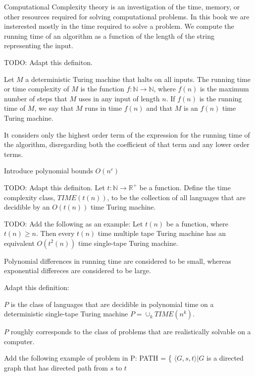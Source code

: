 {\color{red} Computational Complexity theory is an investigation of the time, memory, or other resources required for solving computational problems.} In this book we are insterested mostly in the time required to solve a problem. {\color{red} We compute the running time of an algorithm as a function of the length of the string representing the input.}

{\color{red} TODO: Adapt this definiton.}
\begin{definition}
Let $M$ a deterministic Turing machine that halts on all inputs. The running time or time complexity of $M$ is the function $f:\mathbb{N}\rightarrow\mathbb{N}$, where $f(n)$ is the maximum number of steps that $M$ uses in any input of length $n$. If $f(n)$ is the running time of $M$, we say that $M$ runs in time $f(n)$ and that $M$ is an $f(n)$ time Turing machine.
\end{definition}

{\color{red} It considers only the highest order term of the expression for the running time of the algorithm, disregarding both the coefficient of that term and any lower order terms.}

{\color{red} Introduce polynomial bounds $O(n^c)$}

{\color{red} TODO: Adapt this definiton.}
Let $t:\mathbb{N}\rightarrow\mathbb{R}^{+}$ be a function. Define the time complexity class, $TIME(t(n))$, to be the collection of all languages that are decidible by an $O(t(n))$ time Turing machine.

{\color{red} TODO: Add the following as an example:
Let $t(n)$ be a function, where $t(n)\geq n$. Then every $t(n)$ time multiple tape Turing machine has an equivalent $O(t^{2}(n))$ time single-tape Turing machine.
}

{\color{red} Polynomial differences in running time are considered to be small, whereas exponential differeces are considered to be large.}


{\color{red} Adapt this definition:
\begin{definition}
$P$ is the class of languages that are decidible in polynomial time on a deterministic single-tape Turing machine $P=\cup_{k}TIME(n^{k})$.
\end{definition} 

$P$ roughly corresponds to the class of problems that are realistically solvable on a computer.}

{\color{red} Add the following example of problem in P: PATH = \{ $\langle G,s,t\rangle|G$ is a directed graph that has directed path from $s$ to $t$ }

